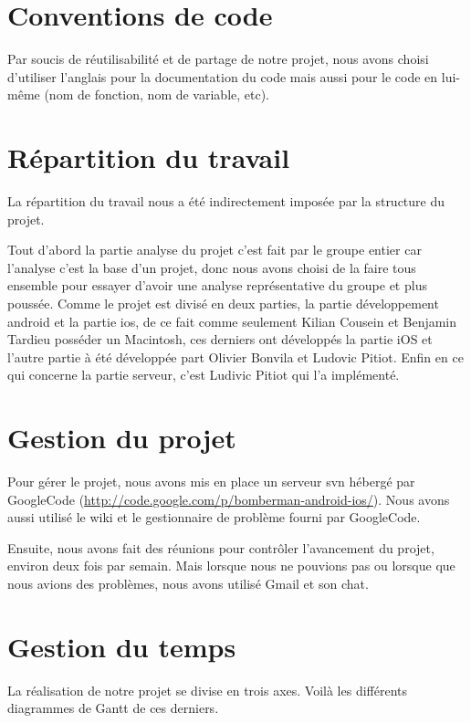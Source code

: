 \section{Conventions de code}
	Par soucis de réutilisabilité et de partage de notre projet, nous avons choisi d'utiliser l'anglais pour la documentation du code mais aussi pour le code en lui-même (nom de fonction, nom de variable, etc).


\section{Répartition du travail}
	La répartition du travail nous a été indirectement imposée par la structure du projet. 
	
	Tout d'abord la partie analyse du projet c'est fait par le groupe entier car l'analyse c'est la base d'un projet, donc nous avons choisi de la faire tous ensemble pour essayer d'avoir une analyse représentative du groupe et plus poussée. Comme le projet est divisé en deux parties, la partie développement \gls{android} et la partie \gls{ios}, de ce fait comme seulement Kilian Cousein et Benjamin Tardieu posséder un Macintosh, ces derniers ont développés la partie iOS et l'autre partie à été développée part Olivier Bonvila et Ludovic Pitiot. Enfin en ce qui concerne la partie serveur, c'est Ludivic Pitiot qui l'a implémenté.
	
	
\section{Gestion du projet}
	Pour gérer le projet, nous avons mis en place un serveur \gls{svn} hébergé par GoogleCode (\url{http://code.google.com/p/bomberman-android-ios/}). Nous avons aussi utilisé le wiki et le gestionnaire de problème fourni par GoogleCode.
	
	Ensuite, nous avons fait des réunions pour contrôler l'avancement du projet, environ deux fois par semain. Mais lorsque nous ne pouvions pas ou lorsque que nous avions des problèmes, nous avons utilisé Gmail et son chat.
	

\section{Gestion du temps}
	La réalisation de notre projet se divise en trois axes. Voilà les différents diagrammes de Gantt de ces derniers.
	
